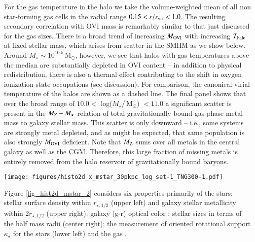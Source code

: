 \documentclass[useAMS,usenatbib]{mnras}
\newcommand{\msun}{\,M$_{\odot}$\xspace}
\newcommand{\ovi}{OVI\xspace}
\newcommand{\gr}{\mbox{(g-r)}\xspace}
\begin{document}
For the gas temperature in the halo we take the volume-weighted mean of all non star-forming gas cells in the radial range $0.15 < r/r_{\rm vir} < 1.0$. The resulting secondary correlation with \ovi mass is remarkably similar to that just discussed for the gas sizes. There is a broad trend of increasing $M_{\rm OVI}$ with increasing $T_{\rm halo}$ at fixed stellar mass, which arises from scatter in the SMHM as we show below. Around $M_\star \sim 10^{10.5}$\msun, however, we see that halos with gas temperatures above the median are substantially depleted in \ovi content -- in addition to physical redistribution, there is also a thermal effect contributing to the shift in oxygen ionization state occupations (see discussion). For comparison, the canonical virial temperature of the halos are shown as a dashed line.
The final panel shows that over the broad range of $10.0 <$ log($M_\star$/\msun) $< 11.0$ a significant scatter is present in the $M_{\rm Z}-M_\star$ relation of total gravitationally bound gas-phase metal mass to galaxy stellar mass. This scatter is only downward -- i.e., some systems are strongly metal depleted, and as might be expected, that same population is also strongly $M_{\rm OVI}$ deficient. Note that $M_{\rm Z}$ sums over all metals in the central galaxy as well as the CGM. Therefore, this large fraction of missing metals is entirely removed from the halo reservoir of gravitationally bound baryons.

\begin{figure*}
\centerline{\texttt{[image: figures/histo2d\_x\_mstar\_30pkpc\_log\_set-1\_TNG300-1.pdf]}}
\caption{ Six different relations of various galaxy/halo properties as a function of \textbf{stellar} mass for central galaxies at $z=0$. 
In each case, we include the median relation (black solid line) and the 10-90 percentiles (dotted black lines). The background 
color shows the median \ovi mass for all systems in that bin. Here we show
(i) central stellar surface density,
(ii) galaxy stellar metallicity,
(iii) \gr stellar color,
(iv) stellar sizes also in half mass radii,
(v) $\kappa$ rotation measure of the stars,
and (vi) $\kappa$ of the gas.
 \label{fig_hist2d_mstar_2}} 
\end{figure*}

Figure \ref{fig_hist2d_mstar_2} considers six properties primarily of the stars: stellar surface density within $r_{\star,1/2}$ (upper left) and galaxy stellar metallicity within $2r_{\star,1/2}$ (upper right); galaxy \mbox{(g-r)} optical color \citep[center left; using the fiducial model of][]{nelson18}; stellar sizes in terms of the half mass radii (center right); the measurement of oriented rotational support $\kappa_\star$ for the stars (lower left) and the gas \citep[lower right; strong spheroids with $\kappa < 0.3$ and prominent disks having $\kappa > 0.6$, see][]{rodriguezgomez17}.
\end{document}
